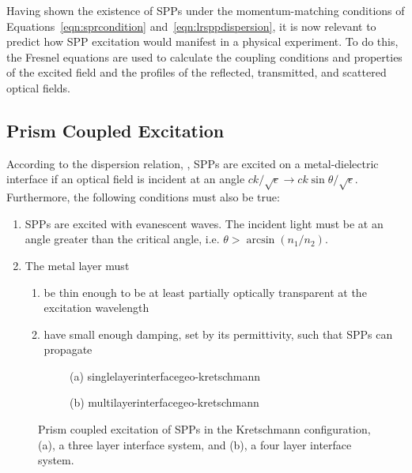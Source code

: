 Having shown the existence of SPPs under the momentum-matching conditions
of Equations~\ref{eqn:sprcondition} and~\ref{eqn:lrsppdispersion}, it is
now relevant to predict how SPP excitation would manifest in a physical
experiment.  To do this, the Fresnel equations are used to calculate the
coupling conditions and properties of the excited field and the profiles of
the reflected, transmitted, and scattered optical fields.  

\subsection{Prism Coupled Excitation}
According to the dispersion relation, , SPPs are
excited on a metal-dielectric interface if an optical field is incident at
an angle $ck/\sqrt{\epsilon} \to ck\sin\theta/\sqrt{\epsilon}$.
Furthermore, the following conditions must also be true:
\begin{enumerate}
\item SPPs are excited with evanescent waves.  The
incident light must be at an angle greater than the critical angle, i.e.
$\theta>\arcsin\left(n_1/n_2\right)$.
\item The metal layer must
\begin{enumerate}
\item be thin enough to be at least partially optically transparent at the excitation wavelength
\item have small enough damping, set by its permittivity, such that SPPs can propagate
\end{enumerate}
\end{enumerate}

\begin{figure}[ht]
 \centering
 \begin{subfigure}[b]{0.4\textwidth}
  \centering(a)
  {singlelayerinterfacegeo-kretschmann}
 \end{subfigure}
 \begin{subfigure}[b]{0.4\textwidth}
  \centering(b)
  {multilayerinterfacegeo-kretschmann}
 \end{subfigure}
\caption{Prism coupled excitation of SPPs in the Kretschmann configuration,
(a), a three layer interface system, and (b), a four layer interface system. }
\label{fig:prismcoupledsetups}
\end{figure}

